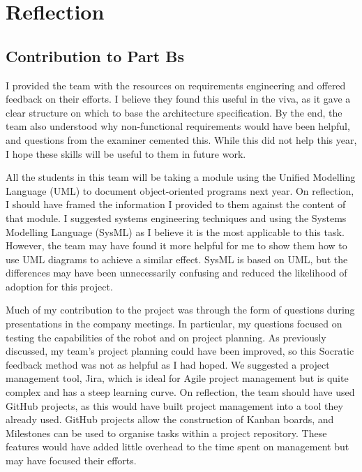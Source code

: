 

\section{Reflection}\label{sec:reflection}
    \subsection{Contribution to Part Bs}\label{subsec:reflection-partBs}
        I provided the team with the resources on requirements engineering and offered feedback on their efforts.
        I believe they found this useful in the viva, as it gave a clear structure on which to base the architecture specification.
        By the end, the team also understood why non-functional requirements would have been helpful, and  questions from the examiner cemented this.
        While this did not help this year, I hope these skills will be useful to them in future work.

        All the students in this team will be taking a module using the Unified Modelling Language (UML) to document object-oriented programs next year.
        On reflection, I should have framed the information I provided to them against the content of that module.
        I suggested systems engineering techniques and using the Systems Modelling Language (SysML) as I believe it is the most applicable to this task.
        However, the team may have found it more helpful for me to show them how to use UML diagrams to achieve a similar effect.
        SysML is based on UML, but the differences may have been unnecessarily confusing and reduced the likelihood of adoption for this project.

        Much of my contribution to the project was through the form of questions during presentations in the company meetings.
        In particular, my questions focused on testing the capabilities of the robot and on project planning.
        As previously discussed, my team's project planning could have been improved, so this Socratic feedback method was not as helpful as I had hoped.
        We suggested a project management tool, Jira, which is ideal for Agile project management but is quite complex and has a steep learning curve.
        On reflection, the team should have used GitHub projects, as this would have built project management into a tool they already used.
        GitHub projects allow the construction of Kanban boards, and Milestones can be used to organise tasks within a project repository.
        These features would have added little overhead to the time spent on management but may have focused their efforts.

